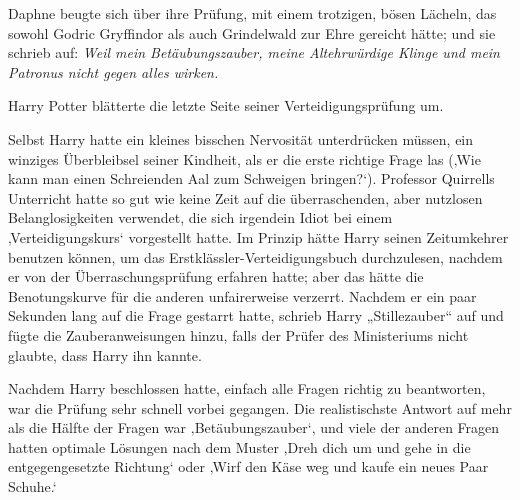 Daphne beugte sich über ihre Prüfung, mit einem trotzigen, bösen Lächeln, das sowohl Godric Gryffindor als auch Grindelwald zur Ehre gereicht hätte; und sie schrieb auf:
\emph{Weil mein Betäubungszauber, meine Altehrwürdige Klinge und mein Patronus nicht gegen alles wirken.}

\later

Harry Potter blätterte die letzte Seite seiner Verteidigungsprüfung um.

Selbst Harry hatte ein kleines bisschen Nervosität unterdrücken müssen, ein winziges Überbleibsel seiner Kindheit, als er die erste richtige Frage las (‚Wie kann man einen Schreienden Aal zum Schweigen bringen?‘). Professor Quirrells Unterricht hatte so gut wie keine Zeit auf die überraschenden, aber nutzlosen Belanglosigkeiten verwendet, die sich irgendein Idiot bei einem ‚Verteidigungskurs‘ vorgestellt hatte. Im Prinzip hätte Harry seinen Zeitumkehrer benutzen können, um das Erstklässler-Verteidigungsbuch durchzulesen, nachdem er von der Überraschungsprüfung erfahren hatte; aber das hätte die Benotungskurve für die anderen unfairerweise verzerrt. Nachdem er ein paar Sekunden lang auf die Frage gestarrt hatte, schrieb Harry
„Stillezauber“ auf und fügte die Zauberanweisungen hinzu, falls der Prüfer des Ministeriums nicht glaubte, dass Harry ihn kannte.

Nachdem Harry beschlossen hatte, einfach alle Fragen richtig zu beantworten, war die Prüfung sehr schnell vorbei gegangen. Die realistischste Antwort auf mehr als die Hälfte der Fragen war ‚Betäubungszauber‘, und viele der anderen Fragen hatten optimale Lösungen nach dem Muster ‚Dreh dich um und gehe in die entgegengesetzte Richtung‘ oder ‚Wirf den Käse weg und kaufe ein neues Paar Schuhe.‘


